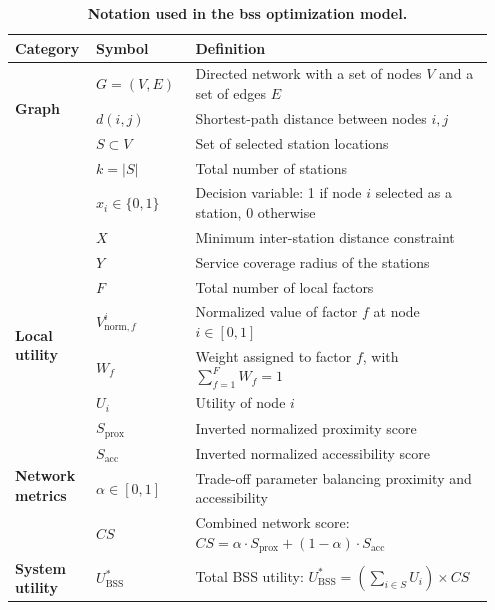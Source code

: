     \begin{table}[!htbp]
    \centering
    \caption[Notation used in the BSS optimization model]{
        \textbf{Notation used in the \ac{bss} optimization model.}
    }
    \label{table:notation}
    \footnotesize
    \begin{tabular}{p{0.15\linewidth}p{0.20\linewidth}p{0.60\linewidth}}
        \toprule
        \textbf{Category} & \textbf{Symbol} & \textbf{Definition} \\
        \midrule
        \multirow{3}{*}[0.5em]{\textbf{Graph}} 
        & $G=(V,E)$ & Directed network with a set of nodes $V$ and a set of edges $E$ \\
        & $d(i,j)$ & Shortest-path distance between nodes $i,j$ \\
        \midrule
        \multirow{5}{*}[0.5em]{\textbf{Stations}} 
        & $S \subset V$ & Set of selected station locations \\
        & $k = |S|$ & Total number of stations \\
        & $x_i \in \{0,1\}$ & Decision variable: 1 if node $i$ selected as a station, 0 otherwise \\
        & $X$ & Minimum inter-station distance constraint \\
        & $Y$ & Service coverage radius of the stations \\
        \midrule
        \multirow{4}{*}[0.5em]{\textbf{Local utility}} 
        & $F$ & Total number of local factors \\
        & $V_{\mathrm{norm},f}^i$ & Normalized value of factor $f$ at node $i \in [0,1]$ \\
        & $W_f$ & Weight assigned to factor $f$, with $\sum_{f=1}^F W_f = 1$ \\
        & $U_i$ & Utility of node $i$ \\
        \midrule
        \multirow{4}{*}[0.5em]{\textbf{Network metrics}} 
        & $S_{\mathrm{prox}}$ & Inverted normalized proximity score \\
        & $S_{\mathrm{acc}}$ & Inverted normalized accessibility score \\
        & $\alpha \in [0,1]$ & Trade-off parameter balancing proximity and accessibility \\
        & $CS$ & Combined network score: $CS = \alpha \cdot S_{\mathrm{prox}} + (1-\alpha) \cdot S_{\mathrm{acc}}$ \\
        \midrule
        \textbf{System utility} & $U^*_{\mathrm{BSS}}$ & Total BSS utility: $U^*_{\mathrm{BSS}} = \left(\sum_{i \in S} U_i\right) \times CS$ \\
        \bottomrule
    \end{tabular}
    \end{table}

